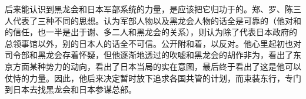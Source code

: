 后来能认识到黑龙会和日本军部系统的力量，是应该把它归功于的。郑、罗、陈三人代表了三种不同的思想。认为军部人物以及黑龙会人物的话全是可靠的（他对和的信任，也一半是出于谢、多二人和黑龙会的关系），则认为除了代表日本政府的总领事馆以外，别的日本人的话全不可信。公开附和着，以反对。他心里起初也对司令部和黑龙会存着怀疑，但他逐渐地透过的吹嘘和黑龙会的胡作非为，看出了东京方面某种势力的动向，看出了日本当局的实在意图，最后终于看出了这是他可以仗恃的力量。因此，他后来决定暂时放下追求各国共管的计划，而束装东行，专门到日本去找黑龙会和日本参谋总部。
